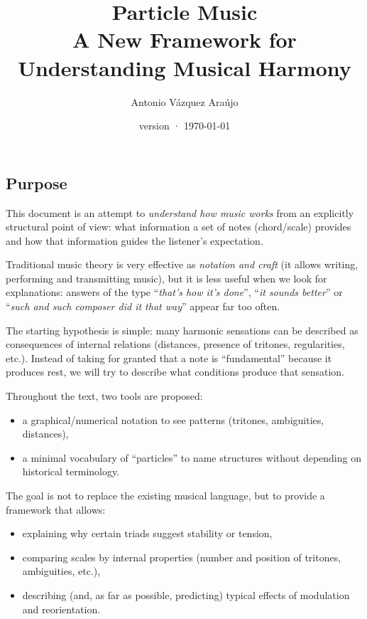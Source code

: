 \documentclass[]{report}
\title{Particle Music \\[1ex] \large A New Framework for Understanding Musical Harmony}
\author{Antonio Vázquez Araújo}
\date{version \docversion{} · \today}
\providecommand{\tightlist}{%
  \setlength{\itemsep}{0pt}
  \setlength{\parskip}{0pt}
}
\begin{document}
\maketitle
\tableofcontents


\subsection{Purpose}
This document is an attempt to \emph{understand how music works} from an explicitly structural point of view: what information a set of notes (chord/scale) provides and how that information guides the listener's expectation.

Traditional music theory is very effective as \emph{notation and craft} (it allows writing, performing and transmitting music), but it is less useful when we look for explanations: answers of the type ``\emph{that's how it's done}'', ``\emph{it sounds better}'' or ``\emph{such and such composer did it that way}'' appear far too often.

The starting hypothesis is simple: many harmonic sensations can be described as consequences of internal relations (distances, presence of tritones, regularities, etc.). Instead of taking for granted that a note is ``fundamental'' because it produces rest, we will try to describe what conditions produce that sensation.

Throughout the text, two tools are proposed:
\begin{itemize}
	\tightlist%
	\item a graphical/numerical notation to see patterns (tritones, ambiguities, distances),
	\item a minimal vocabulary of ``particles'' to name structures without depending on historical terminology.
\end{itemize}

The goal is not to replace the existing musical language, but to provide a framework that allows:
\begin{itemize}
	\tightlist%
	\item explaining why certain triads suggest stability or tension,
	\item comparing scales by internal properties (number and position of tritones, ambiguities, etc.),
	\item describing (and, as far as possible, predicting) typical effects of modulation and reorientation.
\end{itemize}
\end{document}
